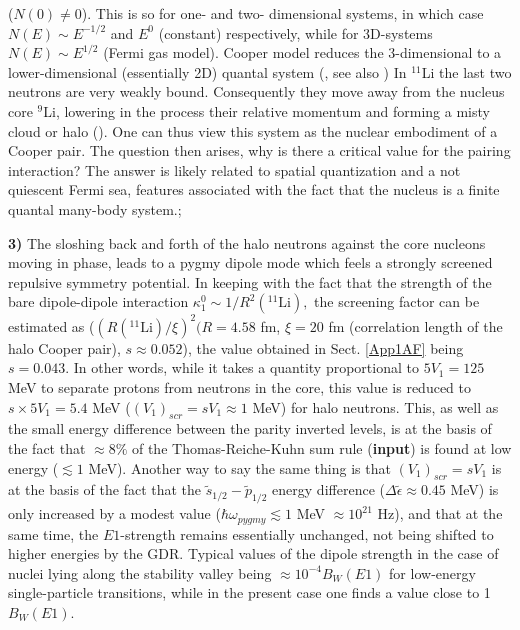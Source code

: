 {	 ($N(0)\neq0$). This is so for one- and two- dimensional systems, in which case $N(E)\sim E^{-1/2}$ and $E^0$ (constant) respectively, while for 3D-systems $N(E)\sim E^{1/2}$ (Fermi gas model). Cooper model reduces the  3-dimensional to a lower-dimensional (essentially 2D) quantal system (\cite{Gorkov:12}, see also \cite{Cohen:11}) In $^{11}$Li the last two neutrons are very weakly bound. Consequently they move away from the nucleus  core $^9$Li, lowering in the process their relative momentum and forming a misty cloud or halo (\cite{Austin:95}). One can thus view this system as the nuclear embodiment of a Cooper pair. The question then arises, why is there  a critical value for the pairing interaction? The answer is likely related to spatial quantization and a not quiescent Fermi sea, features associated with the fact that the nucleus is a finite quantal many-body system.};

\textbf{3)} The sloshing back and forth of the halo neutrons  against the core nucleons moving in phase, leads to a pygmy dipole mode 
 which feels a strongly screened repulsive symmetry potential. In keeping with the fact that the strength of the bare dipole-dipole interaction $\kappa_1^0\sim1/R^2(^{11}\text{Li}),$ the screening factor can be estimated as ($(R(^{11}\text{Li})/\xi)^2(R=4.58$  fm, $\xi=20$ fm (correlation length of the halo Cooper pair), $s\approx0.052$), the value obtained in Sect. \ref{App1AF} being $s=0.043$. In other words, while it takes  a quantity proportional to $5V_1=125$ MeV to separate protons from neutrons in the core, this value is reduced to $s\times 5 V_1=5.4$ MeV ($(V_1)_{scr}=sV_1\approx1$ MeV) for halo neutrons. This, as well as the small energy difference between the parity inverted levels,  is at the basis of the fact that $\approx 8\%$ of the Thomas-Reiche-Kuhn sum rule (\textbf{input}) is found at low energy ($\lesssim1$ MeV). Another way to say the same thing is that $(V_1)_{scr}=sV_1$ is at the basis of the fact that the $\widetilde s_{1/2}- \widetilde p_{1/2}$ energy difference ($\Delta \tilde\epsilon\approx 0.45$ MeV) is only increased by a modest value ($\hbar \omega_{pygmy}\lesssim 1$ MeV $\approx 10^{21}$ Hz), and that at the same time, the $E1$-strength remains essentially unchanged, not being shifted to higher energies by the GDR. Typical values of the dipole strength in the case of nuclei lying along the stability valley being $\approx 10^{-4} B_{W} (E1)$ for  low-energy  single-particle transitions, while in the present case one finds a value close to 1$B_{W}(E1)$. 




